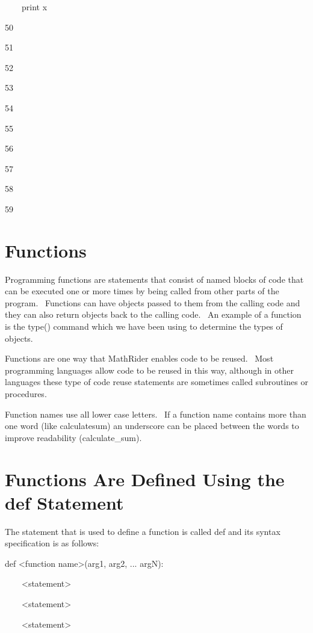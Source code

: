 \documentclass[12pt,twoside]{book}
\begin{document}
\ \ \ \ print x

{\textbar}

50

51

52

53

54

55

56

57

58

59

\section[Functions]{Functions}
Programming functions are statements that consist of named blocks of
code that can be executed one or more times by being called from other
parts of the program. \ Functions can have objects passed to them from
the calling code and they can also return objects back to the calling
code. \ An example of a function is the type() command which we have
been using to determine the types of objects.


\bigskip

Functions are one way that MathRider enables code to be reused. \ Most
programming languages allow code to be reused in this way, although in
other languages these type of code reuse statements are sometimes
called subroutines or procedures.


\bigskip

Function names use all lower case letters. \ If a function name contains
more than one word (like calculatesum) an underscore can be placed
between the words to improve readability (calculate\_sum).

\section[Functions Are Defined Using the def Statement]{Functions Are Defined Using the def Statement}
The statement that is used to define a function is called def and its
syntax specification is as follows:


\bigskip

def {\textless}function name{\textgreater}(arg1, arg2, ... argN):

\ \ \ \ {\textless}statement{\textgreater}

\ \ \ \ {\textless}statement{\textgreater}

\ \ \ \ {\textless}statement{\textgreater}
\end{document}
